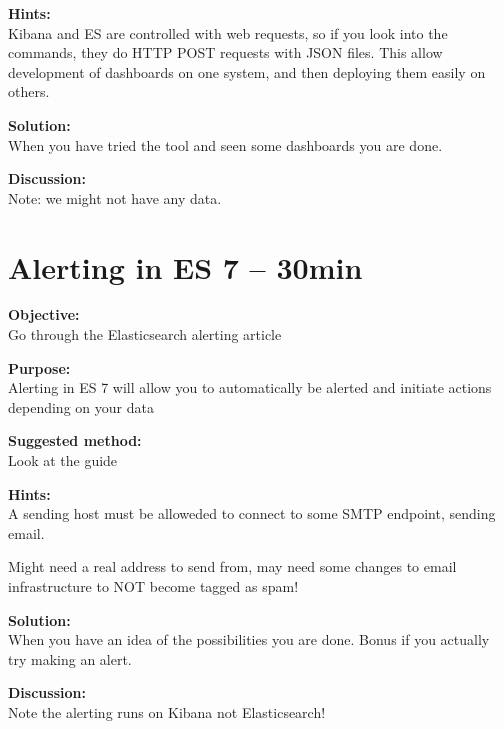 \documentclass[a4paper,11pt,notitlepage]{report}
\begin{document}
{\bf Hints:}\\
Kibana and ES are controlled with web requests, so if you look into the commands, they do HTTP POST requests with JSON files. This allow development of dashboards on one system, and then deploying them easily on others.

{\bf Solution:}\\
When you have tried the tool and seen some dashboards you are done.



{\bf Discussion:}\\
Note: we might not have any data.



\chapter{Alerting in ES 7 -- 30min}
\label{ex:es7-alerting}


{\bf Objective:}\\
Go through the Elasticsearch alerting article

{\bf Purpose:}\\
Alerting in ES 7 will allow you to automatically be alerted and initiate actions depending on your data


{\bf Suggested method:}\\
Look at the guide



{\bf Hints:}\\
A sending host must be alloweded to connect to some SMTP endpoint, sending email.

Might need a real address to send from, may need some changes to email infrastructure to NOT become tagged as spam!



{\bf Solution:}\\
When you have an idea of the possibilities you are done. Bonus if you actually try making an alert.

{\bf Discussion:}\\
Note the alerting runs on Kibana not Elasticsearch!
\end{document}
